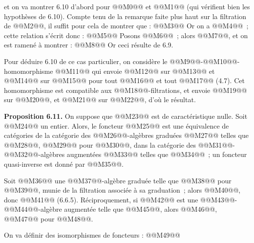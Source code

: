 
et on va
montrer 6.10 d'abord pour @@M0@@ et @@M1@@ (qui vérifient bien les hypothèses de 6.10). Compte tenu de la remarque faite plus haut sur la filtration de @@M2@@, il suffit pour cela de montrer que :
@@M3@@
Or on a @@M4@@~; cette relation s'écrit donc :
@@M5@@
Posons @@M6@@~; alors @@M7@@, et on est ramené à montrer :
@@M8@@
Or ceci résulte de 6.9.

Pour déduire 6.10 de ce cas particulier, on considère le @@M9@@-@@M10@@-homomorphisme @@M11@@ qui envoie @@M12@@ sur @@M13@@ et @@M14@@ sur @@M15@@ pour tout @@M16@@ et tout @@M17@@ (4.7). Cet homomorphisme est compatible aux @@M18@@-filtrations, et envoie @@M19@@ sur @@M20@@, et @@M21@@ sur @@M22@@, d'où le résultat.

\textbf{Proposition 6.11.} On suppose que @@M23@@ est de caractéristique nulle. Soit @@M24@@ un entier. Alors, le foncteur @@M25@@ est une équivalence de catégories de la catégorie des @@M26@@-algèbres graduées @@M27@@ telles que @@M28@@, @@M29@@ pour @@M30@@, dans la catégorie des @@M31@@-@@M32@@-algèbres augmentées @@M33@@ telles que @@M34@@~; un foncteur quasi-inverse est donné par @@M35@@.

Soit @@M36@@ une @@M37@@-algèbre graduée telle que @@M38@@ pour @@M39@@, munie de la filtration associée à sa graduation~; alors @@M40@@, donc @@M41@@ (6.6.5). Réciproquement, si @@M42@@ est une @@M43@@-@@M44@@-algèbre augmentée telle que @@M45@@, alors @@M46@@, @@M47@@ pour @@M48@@.

On va définir des isomorphismes de foncteurs :
@@M49@@
